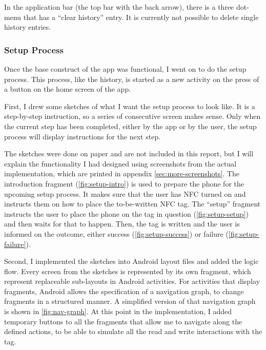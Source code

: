 \documentclass[conference]{IEEEtran}
\begin{document}
In the application bar (the top bar with the back arrow), there is a three dot-menu that has a ``clear history'' entry. It is currently not possible to delete single history entries.

\subsubsection{Setup Process}
Once the base construct of the app was functional, I went on to do the setup process. This process, like the history, is started as a new activity on the press of a button on the home screen of the app.

First, I drew some sketches of what I want the setup process to look like. It is a step-by-step instruction, so a series of consecutive screen makes sense. Only when the current step has been completed, either by the app or by the user, the setup process will display instructions for the next step.

The sketches were done on paper and are not included in this report, but I will explain the functionality I had designed using screenshots from the actual implementation, which are printed in appendix \ref{sec:more-screenshots}.
The introduction fragment (\cref{fig:setup-intro}) is used to prepare the phone for the upcoming setup process. It makes sure that the user has NFC turned on and instructs them on how to place the to-be-written NFC tag. The ``setup'' fragment instructs the user to place the phone on the tag in question (\cref{fig:setup-setup}) and then waits for that to happen. Then, the tag is written and the user is informed on the outcome, either success (\cref{fig:setup-success}) or failure (\cref{fig:setup-failure}).

Second, I implemented the sketches into Android layout files and added the logic flow. Every screen from the sketches is represented by its own fragment, which represent replaceable sub-layouts in Android activities. For activities that display fragments, Android allows the specification of a navigation graph, to change fragments in a structured manner. A simplified version of that navigation graph is shown in \cref{fig:nav-graph}. At this point in the implementation, I added temporary buttons to all the fragments that allow me to navigate along the defined actions, to be able to simulate all the read and write interactions with the tag.
\end{document}
